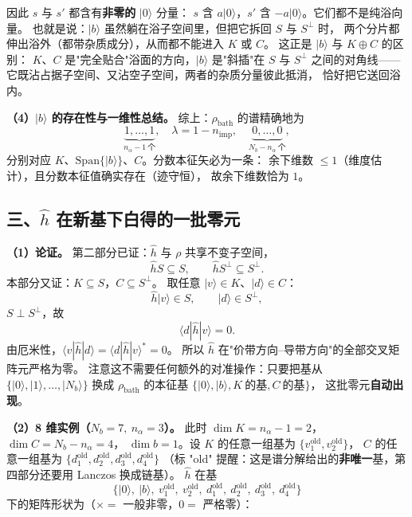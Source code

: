 \documentclass[11pt]{ctexart}
\begin{document}
因此 $s$ 与 $s'$ 都含有\textbf{非零的} $|0\rangle$ 分量：
$s$ 含 $a|0\rangle$，$s'$ 含 $-a|0\rangle$。它们都不是纯浴向量。
也就是说：$|b\rangle$ 虽然躺在浴子空间里，但把它拆回 $S$ 与 $S^{\perp}$ 时，
两个分片都伸出浴外（都带杂质成分），从而都不能进入 $K$ 或 $C$。
这正是 $|b\rangle$ 与 $K\oplus C$ 的区别：
$K$、$C$ 是"完全贴合"浴面的方向，$|b\rangle$ 是"斜插"在 $S$ 与 $S^{\perp}$
之间的对角线——它既沾占据子空间、又沾空子空间，两者的杂质分量彼此抵消，
恰好把它送回浴内。

\textbf{（4）$|b\rangle$ 的存在性与一维性总结。}
综上：$\rho_{\mathrm{bath}}$ 的谱精确地为
\[
\underbrace{1,\dots,1}_{n_\alpha-1\ \text{个}},\quad
\lambda=1-n_{\mathrm{imp}},\quad
\underbrace{0,\dots,0}_{N_b-n_\alpha\ \text{个}},
\]
分别对应 $K$、$\mathrm{Span}\{|b\rangle\}$、$C$。分数本征矢必为一条：
余下维数 $\le1$（维度估计），且分数本征值确实存在（迹守恒），
故余下维数恰为 $1$。

\subsection{三、$\hat h$ 在新基下白得的一批零元}

\textbf{（1）论证。}
第二部分已证：$\hat h$ 与 $\rho$ 共享不变子空间，
\[
\hat h S\subseteq S,\qquad \hat h S^{\perp}\subseteq S^{\perp}.
\]
本部分又证：$K\subseteq S$，$C\subseteq S^{\perp}$。
取任意 $|v\rangle\in K$、$|d\rangle\in C$：
\[
\hat h|v\rangle\in S,\qquad |d\rangle\in S^{\perp},
\]
$S\perp S^{\perp}$，故
\[
\langle d|\hat h|v\rangle=0.
\]
由厄米性，$\langle v|\hat h|d\rangle=\langle d|\hat h|v\rangle^*=0$。
所以 $\hat h$ 在"价带方向--导带方向"的全部交叉矩阵元严格为零。
注意这不需要任何额外的对准操作：只要把基从
$\{|0\rangle,|1\rangle,\dots,|N_b\rangle\}$ 换成 $\rho_{\mathrm{bath}}$ 的本征基
$\{|0\rangle,|b\rangle,K\ \text{的基},C\ \text{的基}\}$，
这批零元\textbf{自动出现}。

\textbf{（2）8 维实例（$N_b=7,\ n_\alpha=3$）。}
此时 $\dim K=n_\alpha-1=2$，$\dim C=N_b-n_\alpha=4$，
$\dim b=1$。设 $K$ 的任意一组基为 $\{v_1^{\mathrm{old}},v_2^{\mathrm{old}}\}$，
$C$ 的任意一组基为 $\{d_1^{\mathrm{old}},d_2^{\mathrm{old}},d_3^{\mathrm{old}},d_4^{\mathrm{old}}\}$
（标 "old" 提醒：这是谱分解给出的\textbf{非唯一}基，第四部分还要用 Lanczos 换成链基）。
$\hat h$ 在基
\[
\big\{|0\rangle,\ |b\rangle,\ v_1^{\mathrm{old}},\ v_2^{\mathrm{old}},\
d_1^{\mathrm{old}},\ d_2^{\mathrm{old}},\ d_3^{\mathrm{old}},\ d_4^{\mathrm{old}}\big\}
\]
下的矩阵形状为（$\times=$ 一般非零，$0=$ 严格零）：
\end{document}

